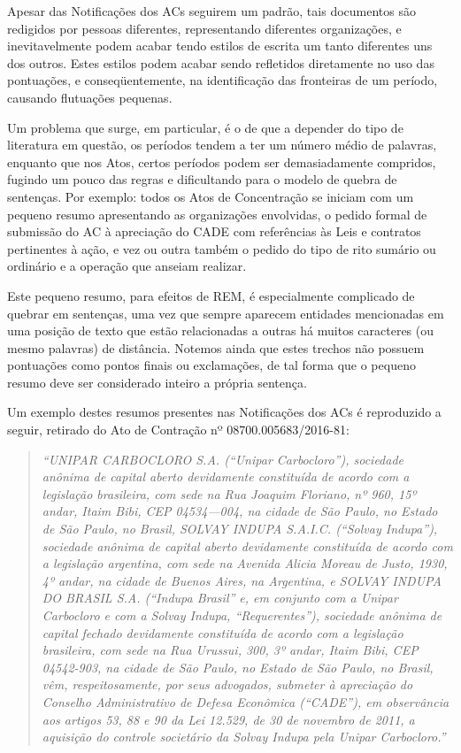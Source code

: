 \documentclass[11pt]{report}
\newcommand{\quotes}[1]{``#1''}
\begin{document}
\indent\indent Apesar das Notificações dos ACs seguirem um padrão, tais documentos são redigidos por pessoas diferentes, representando diferentes organizações, e inevitavelmente
podem acabar tendo estilos de escrita um tanto diferentes uns dos outros. Estes estilos podem acabar sendo refletidos diretamente no uso das pontuações, e conseqüentemente,
na identificação das fronteiras de um período, causando flutuações pequenas.

Um problema que surge, em particular, é o de que a depender do tipo de literatura em questão, os períodos tendem a ter um número médio de palavras, enquanto que
nos Atos, certos períodos podem ser demasiadamente compridos, fugindo um pouco das regras e dificultando para o modelo de quebra de sentenças.
Por exemplo: todos os Atos de Concentração se iniciam com um pequeno resumo apresentando as organizações envolvidas, o pedido formal de submissão do AC à apreciação do CADE
com referências às Leis e contratos pertinentes à ação, e vez ou outra também o pedido do tipo de rito sumário ou ordinário e a operação que anseiam realizar.

Este pequeno resumo, para efeitos de REM, é especialmente complicado de quebrar em sentenças, uma vez que sempre aparecem entidades mencionadas
em uma posição de texto que estão relacionadas a outras há muitos caracteres (ou mesmo palavras) de distância. Notemos ainda que estes trechos não possuem pontuações como pontos finais ou
exclamações, de tal forma que o pequeno resumo deve ser considerado inteiro a própria sentença.

Um exemplo destes resumos presentes nas Notificações dos ACs é reproduzido a seguir, retirado do Ato de Contração nº 08700.005683/2016-81:

\begin{quote}
  \textit{\quotes{UNIPAR CARBOCLORO S.A. (“Unipar Carbocloro”), sociedade anônima de capital aberto devidamente constituída de acordo com a legislação brasileira, com sede na Rua
  Joaquim Floriano, nº 960, 15º andar, Itaim Bibi, CEP 04534—004, na cidade de São Paulo, no Estado de São Paulo, no Brasil, SOLVAY INDUPA S.A.I.C. (“Solvay Indupa”),
  sociedade anônima de capital aberto devidamente constituída de acordo com a legislação argentina, com sede na Avenida Alicia Moreau de Justo, 1930, 4º andar, na cidade de
  Buenos Aires, na Argentina, e SOLVAY INDUPA DO BRASIL S.A. (“Indupa Brasil” e, em conjunto com a Unipar Carbocloro e com a Solvay Indupa, “Requerentes”), sociedade anônima
  de capital fechado devidamente constituída de acordo com a legislação brasileira, com sede na Rua Urussui, 300, 3º andar, Itaim Bibi, CEP 04542-903, na cidade de São Paulo,
  no Estado de São Paulo, no Brasil, vêm, respeitosamente, por seus advogados, submeter à apreciação do Conselho Administrativo de Defesa Econômica (“CADE”), em observância aos
  artigos 53, 88 e 90 da Lei 12.529, de 30 de novembro de 2011, a aquisição do controle societário da Solvay Indupa pela Unipar Carbocloro.}}
\end{quote}
\end{document}
